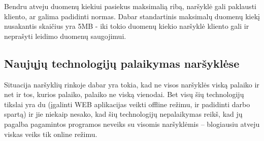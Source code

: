 \documentclass[12pt,a4paper,titlepage]{article}
\begin{document}
Bendru atveju duomenų kiekiui pasiekus maksimalią ribą, naršyklė gali paklausti kliento, ar galima padidinti normas. Dabar standartinis maksimalų duomenų kiekį nusakantis skaičius yra 5MB - iki tokio duomenų kiekio naršyklė kliento gali ir neprašyti leidimo duomenų saugojimui.

\subsection{Naujųjų technologijų palaikymas naršyklėse}

Situacija naršyklių rinkoje dabar yra tokia, kad ne visos naršyklės viską palaiko ir net ir tos, kurios palaiko, palaiko ne viską vienodai. Bet visų šių technologijų tikslai yra du (įgalinti WEB aplikacijas veikti offline režimu, ir padidinti darbo spartą) ir jie niekaip nesako, kad šių technologijų nepalaikymas reikš, kad jų pagalba pagamintos programos neveiks su visomis naršyklėmis – blogiausiu atveju viskas veiks tik online režimu.
\end{document}
